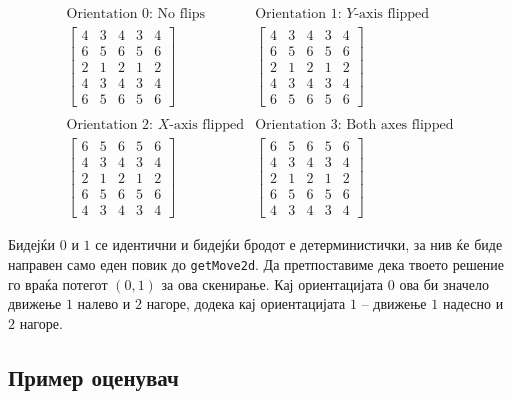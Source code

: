\documentclass[12pt]{article}
\begin{document}
\[
\begin{array}{cc}
\text{Orientation $0$: No flips} & \text{Orientation $1$: $Y$-axis flipped} \\
\left[
\begin{array}{ccccc}
4 & 3 & 4 & 3 & 4 \\
6 & 5 & 6 & 5 & 6 \\
2 & 1 & 2 & 1 & 2 \\
4 & 3 & 4 & 3 & 4 \\
6 & 5 & 6 & 5 & 6
\end{array}
\right]
&
\left[
\begin{array}{ccccc}
4 & 3 & 4 & 3 & 4 \\
6 & 5 & 6 & 5 & 6 \\
2 & 1 & 2 & 1 & 2 \\
4 & 3 & 4 & 3 & 4 \\
6 & 5 & 6 & 5 & 6
\end{array}
\right]
\\
\\
\text{Orientation $2$: $X$-axis flipped} & \text{Orientation $3$: Both axes flipped} \\
\left[
\begin{array}{ccccc}
6 & 5 & 6 & 5 & 6 \\
4 & 3 & 4 & 3 & 4 \\
2 & 1 & 2 & 1 & 2 \\
6 & 5 & 6 & 5 & 6 \\
4 & 3 & 4 & 3 & 4
\end{array}
\right]
&
\left[
\begin{array}{ccccc}
6 & 5 & 6 & 5 & 6 \\
4 & 3 & 4 & 3 & 4 \\
2 & 1 & 2 & 1 & 2 \\
6 & 5 & 6 & 5 & 6 \\
4 & 3 & 4 & 3 & 4
\end{array}
\right]
\end{array}
\] 

Бидејќи $0$ и $1$ се идентични и бидејќи бродот е детерминистички, за нив ќе биде направен само еден повик до \verb|getMove2d|. Да претпоставиме дека твоето решение го враќа потегот $(0, 1)$ за ова скенирање. Кај ориентацијата $0$ ова би значело движење $1$ налево и $2$ нагоре, додека кај ориентацијата $1$ -- движење $1$ надесно и $2$ нагоре.

\subsection{Пример оценувач}
\end{document}
